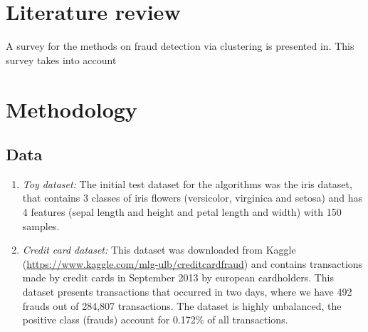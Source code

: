 \documentclass[conference]{IEEEtran}
\begin{document}
\section{Literature review}
A survey for the methods on fraud detection via clustering is presented in\cite{Sabau2012}. This survey takes into account

\section{Methodology}

\subsection{Data}
\begin{enumerate}
    \item \textit{Toy dataset: }The initial test dataset for the algorithms was the iris dataset, that contains 3 classes of iris flowers (versicolor, virginica and setosa) and has 4 features (sepal length and height and petal length and width) with 150 samples.
    \item \textit{Credit card dataset: } This dataset was downloaded from Kaggle (\url{https://www.kaggle.com/mlg-ulb/creditcardfraud}) and contains transactions made by credit cards in September 2013 by european cardholders. This dataset presents transactions that occurred in two days, where we have 492 frauds out of 284,807 transactions. The dataset is highly unbalanced, the positive class (frauds) account for 0.172\% of all transactions.
\end{enumerate}
\end{document}
